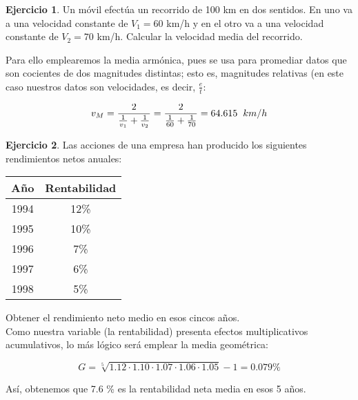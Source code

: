 \documentclass[a4paper, 12pt]{article}
\theoremstyle{definition}
\newtheorem{ej}{Ejercicio}
\begin{document}
\begin{ej}
Un móvil efectúa un recorrido de 100 km en dos sentidos. En uno va a una velocidad constante de \(V_1 = 60\) km/h y en el otro va a una velocidad constante de \(V_2 = 70\) km/h. Calcular la velocidad media del recorrido. 
\newline

Para ello emplearemos la media armónica, pues se usa para promediar datos que son cocientes de dos magnitudes distintas; esto es, magnitudes relativas (en este caso nuestros datos son velocidades, es decir, \(\frac{e}{t}\):

\[
v_M = \frac{2}{\frac{1}{v_1} + \frac{1}{v_2}} = \frac{2}{\frac{1}{60} + \frac{1}{70}} = 64.615 \hspace{0.2cm} km/h
\]
\end{ej}

\begin{ej}
Las acciones de una empresa han producido los siguientes rendimientos netos anuales:

\begin{center}
    \begin{tabular}{c c}
         Año & Rentabilidad  \\
         \hline
         1994 & 12\% \\
         1995 & 10\% \\
         1996 & 7\% \\
         1997 & 6\% \\
         1998 & 5\%
    \end{tabular}
\end{center}

Obtener el rendimiento neto medio en esos cincos años. \\

Como nuestra variable (la rentabilidad) presenta efectos multiplicativos acumulativos, lo más lógico será emplear la media geométrica:

\[
G = \sqrt[5]{1.12 \cdot 1.10 \cdot 1.07 \cdot 1.06 \cdot 1.05} -1= 0.079 \% 
\]

Así, obtenemos que 7.6 \% es la rentabilidad neta media en esos 5 años.
\end{ej}
\end{document}
